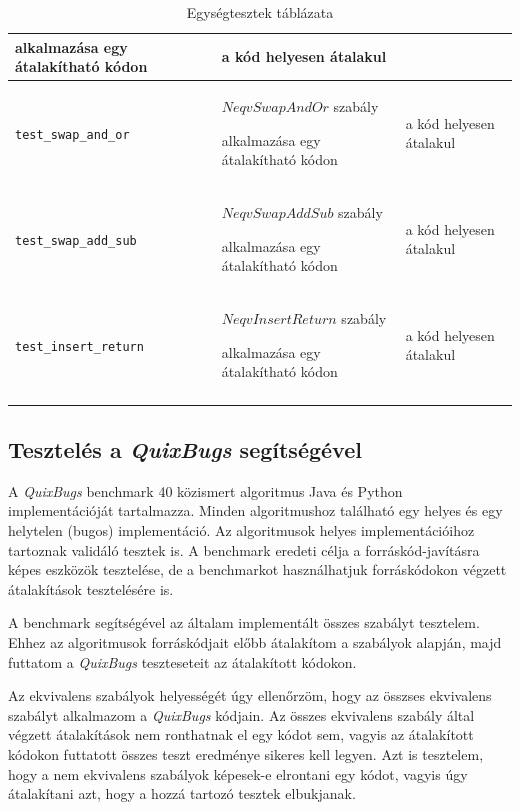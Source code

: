 \begin{center}
\begin{longtable}{ | p{} | p{} | p{} | }
		alkalmazása egy átalakítható kódon
		&
		a kód helyesen átalakul
		\\
		\hline

		\texttt{\lstinline{test_swap_and_or}}
		&
		$NeqvSwapAndOr$ szabály
		
		alkalmazása egy átalakítható kódon
		&
		a kód helyesen átalakul
		\\
		\hline

		\texttt{\lstinline{test_swap_add_sub}}
		&
		$NeqvSwapAddSub$ szabály
		
		alkalmazása egy átalakítható kódon
		&
		a kód helyesen átalakul
		\\
		\hline

		\texttt{\lstinline{test_insert_return}}
		&
		$NeqvInsertReturn$ szabály
		
		alkalmazása egy átalakítható kódon
		&
		a kód helyesen átalakul
		\\
		\hline

		\caption{Egységtesztek táblázata}
		\label{tab:unit_tests}
	\end{longtable}
\end{center}

\pagebreak

\subsection{Tesztelés a \emph{QuixBugs} segítségével\label{sec:QuixBugs}}

A \emph{QuixBugs} benchmark 40 közismert algoritmus Java és Python implementációját tartalmazza.
Minden algoritmushoz található egy helyes és egy helytelen (bugos) implementáció.
Az algoritmusok helyes implementációihoz tartoznak validáló tesztek is.
A benchmark eredeti célja a forráskód-javításra képes eszközök tesztelése,
de a benchmarkot használhatjuk forráskódokon végzett átalakítások tesztelésére is.

A benchmark segítségével az általam implementált összes szabályt tesztelem.
Ehhez az algoritmusok forráskódjait előbb átalakítom a szabályok alapján,
majd futtatom a \emph{QuixBugs} teszteseteit az átalakított kódokon.

Az ekvivalens szabályok helyességét úgy ellenőrzöm,
hogy az összses ekvivalens szabályt alkalmazom a \emph{QuixBugs} kódjain.
Az összes ekvivalens szabály által végzett átalakítások nem ronthatnak el egy kódot sem,
vagyis az átalakított kódokon futtatott összes teszt eredménye sikeres kell legyen.
Azt is tesztelem, hogy a nem ekvivalens szabályok képesek-e elrontani egy kódot,
vagyis úgy átalakítani azt, hogy a hozzá tartozó tesztek elbukjanak.

